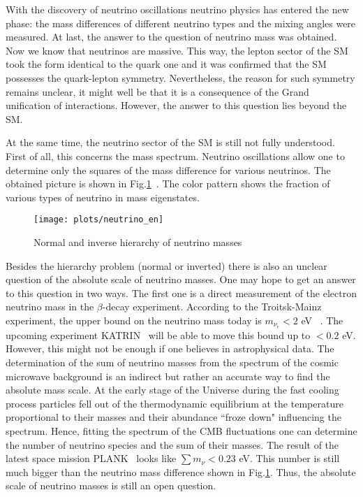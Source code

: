 \documentclass{cernyrep}
\begin{document}
With the discovery of neutrino oscillations neutrino physics has entered the new phase: the mass differences of different neutrino  types and the mixing angles were measured.  At last, the answer to the question of neutrino mass was obtained. Now we know that neutrinos are massive. This way, the lepton sector of the SM took the form identical to the  quark one and it was confirmed that the SM possesses the quark-lepton symmetry.  Nevertheless, the reason for such symmetry remains unclear, it might well be that it is a consequence of the Grand unification of interactions. However, the answer to this question lies beyond the SM. 

At the same time, the neutrino sector of the SM is still not fully understood.  First of all, this concerns the mass spectrum.  Neutrino oscillations allow one to determine only the squares of the mass difference for various neutrinos. The obtained picture is shown in Fig.\ref{neutrino}~\cite{neutrino_hierarchy}.  The color pattern shows the fraction of various types of neutrino in mass eigenstates. 
 \begin{figure}[ht]
\begin{center}
\leavevmode
\texttt{[image: plots/neutrino\_en]}
\end{center}
\caption{Normal and inverse hierarchy of neutrino masses}
\label{neutrino}
\end{figure}

Besides the hierarchy problem (normal or inverted) there is also an unclear question of the absolute scale of neutrino masses.  One may hope to get an answer to this question in two ways. The first one is a direct measurement of the electron neutrino mass in the $\beta$-decay experiment. According to the Troitsk-Mainz experiment, the upper bound on the neutrino mass today is $m_{\nu_e}< 2$ eV ~\cite{TroitskMainz}. The upcoming experiment KATRIN~\cite{KATRIN} will be able to move this bound up to
$<0.2$ eV. However, this might not be enough if one believes in astrophysical data. The determination of the sum of neutrino masses from the spectrum of the cosmic microwave background  is an indirect but rather an accurate way to find the absolute mass scale. At the early stage of the Universe during the fast cooling
process particles  fell out of the thermodynamic  equilibrium  at the temperature proportional to their masses and their abundance ``froze down" influencing the spectrum. Hence, fitting the spectrum of the CMB fluctuations one can determine the number of neutrino species and the sum of their masses.  The result of the latest space mission PLANK~\cite{Plank} looks like $\sum m_\nu <0.23$ eV. This number is still much bigger than the neutrino mass difference shown in Fig.\ref{neutrino}.
Thus, the absolute scale of neutrino masses is still an open question.
\end{document}
